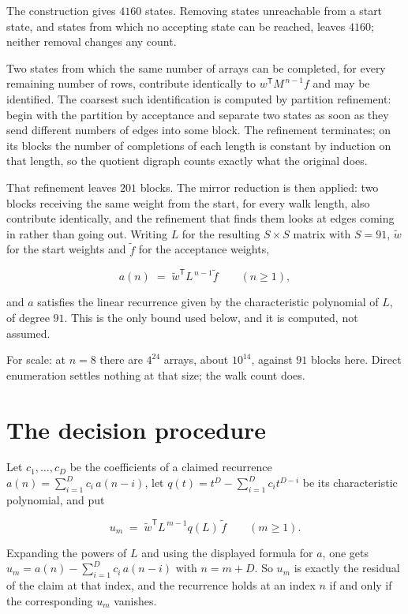 \documentclass[11pt]{article}
\theoremstyle{definition}
\begin{document}
The construction gives $4160$ states. Removing states unreachable from a start state, and states from which no accepting state can be reached, leaves $4160$; neither removal changes any count.

Two states from which the same number of arrays can be completed, for every remaining number of rows, contribute identically to $w^{\mathsf T}M^{\,n-1}f$ and may be identified. The coarsest such identification is computed by partition refinement: begin with the partition by acceptance and separate two states as soon as they send different numbers of edges into some block. The refinement terminates; on its blocks the number of completions of each length is constant by induction on that length, so the quotient digraph counts exactly what the original does.

That refinement leaves $201$ blocks. The mirror reduction is then applied: two blocks receiving the same weight from the start, for every walk length, also contribute identically, and the refinement that finds them looks at edges coming in rather than going out. Writing $L$ for the resulting $S \times S$ matrix with $S = 91$, $\tilde w$ for the start weights and $\tilde f$ for the acceptance weights,

\[a(n) \;=\; \tilde w^{\mathsf T} L^{\,n-1} \tilde f \qquad (n \ge 1),\]

and $a$ satisfies the linear recurrence given by the characteristic polynomial of $L$, of degree $91$. This is the only bound used below, and it is computed, not assumed.

For scale: at $n = 8$ there are $4^{24}$ arrays, about $10^{14}$, against $91$ blocks here. Direct enumeration settles nothing at that size; the walk count does.

\section{The decision procedure}

Let $c_1,\dots,c_D$ be the coefficients of a claimed recurrence $a(n) = \sum_{i=1}^{D} c_i\,a(n-i)$, let $q(t) = t^{D} - \sum_{i=1}^{D} c_i t^{D-i}$ be its characteristic polynomial, and put

\[u_m \;=\; \tilde w^{\mathsf T} L^{\,m-1} q(L)\,\tilde f \qquad (m \ge 1).\]

Expanding the powers of $L$ and using the displayed formula for $a$, one gets $u_m = a(n) - \sum_{i=1}^{D} c_i\,a(n-i)$ with $n = m + D$. So $u_m$ is exactly the residual of the claim at that index, and the recurrence holds at an index $n$ if and only if the corresponding $u_m$ vanishes.
\end{document}
